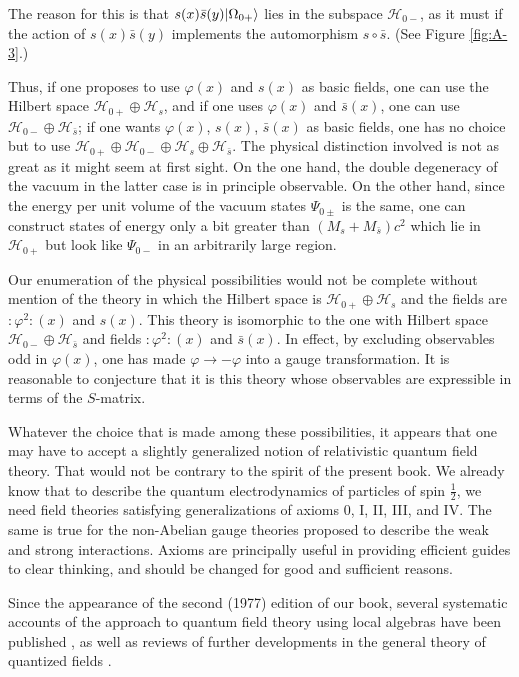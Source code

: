The reason for this is that $s(x)\bar s(y)\lvert \Omega_{0+}\rangle$ lies in the
subspace $\mathcal H_{0-}$, as it must if the action of $s(x)\bar s(y)$
implements the automorphism $s\mathbin\circ\bar s$.  (See Figure \ref{fig:A-3}.)



Thus, if one proposes to use $\varphi(x)$ and $s(x)$ as basic fields, one can
use the Hilbert space $\mathcal H_{0+}\oplus\mathcal H_s$, and if one uses
$\varphi(x)$ and $\bar s(x)$, one can use
$\mathcal H_{0-}\oplus\mathcal H_{\bar s}$; if one wants
$\varphi(x)$, $s(x)$, $\bar s(x)$ as basic fields, one has no choice but to
use $\mathcal H_{0+}\oplus\mathcal H_{0-}\oplus\mathcal H_s\oplus
\mathcal H_{\bar s}$.  The physical distinction involved is not as great as
it might seem at first sight.  On the one hand, the double degeneracy of the
vacuum in the latter case is in principle observable.  On the other hand,
since the energy per unit volume of the vacuum states $\Psi_{0\pm}$ is the
same, one can construct states of energy only a bit greater than
$(M_s+M_{\bar s})c^2$ which lie in $\mathcal H_{0+}$ but look like
$\Psi_{0-}$ in an arbitrarily large region.

Our enumeration of the physical possibilities would not be complete without
mention of the theory in which the Hilbert space is
$\mathcal H_{0+}\oplus\mathcal H_s$ and the fields are
$:\!\varphi^2\!:(x)$ and $s(x)$.  This theory is isomorphic to the one with
Hilbert space $\mathcal H_{0-}\oplus\mathcal H_{\bar s}$ and fields
$:\!\varphi^2\!:(x)$ and $\bar s(x)$.  In effect, by excluding observables
odd in $\varphi(x)$, one has made $\varphi\to-\varphi$ into a gauge
transformation.  It is reasonable to conjecture that it is this theory whose
observables are expressible in terms of the $S$-matrix.

Whatever the choice that is made among these possibilities, it appears that
one may have to accept a slightly generalized notion of relativistic quantum
field theory.  That would not be contrary to the spirit of the present book.
We already know that to describe the quantum electrodynamics of particles of
spin $\tfrac12$, we need field theories satisfying generalizations of axioms
0, I, II, III, and IV.  The same is true for the non-Abelian gauge theories
proposed to describe the weak and strong interactions.  Axioms are
principally useful in providing efficient guides to clear thinking, and
should be changed for good and sufficient reasons.

Since the appearance of the second (1977) edition of our book, several
systematic accounts of the approach to quantum field theory using local
algebras have been published \cite{pct-app-88} \cite{pct-app-89}, as well as reviews of further
developments in the general theory of quantized fields \cite{pct-app-90} \cite{pct-app-91}.
